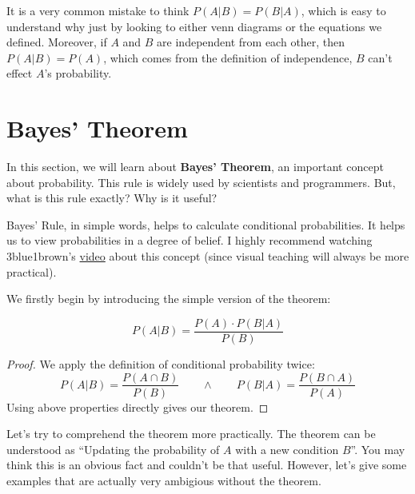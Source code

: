 It is a very common mistake to think $P( A | B) = P(B | A)$, which is easy to understand why just by looking to either venn diagrams or the equations we defined. Moreover, if $A$ and $B$ are independent from each other, then $P(A|B)= P(A)$, which comes from the definition of independence, $B$ can't effect $A$'s probability.

\section{Bayes' Theorem}

In this section, we will learn about \textbf{Bayes' Theorem}, an important concept about probability. This rule is widely used by scientists and programmers. But, what is this rule exactly? Why is it useful?

Bayes' Rule, in simple words, helps to calculate conditional probabilities. It helps us to view probabilities in a degree of belief. I highly recommend watching 3blue1brown's \href{https://www.youtube.com/watch?v=HZGCoVF3YvM&feature=emb_title}{video} about this concept (since visual teaching will always be more practical).

\par

We firstly begin by introducing the simple version of the theorem:
\begin{theorem}
    $$ P(A|B) = \frac{P(A) \cdot P(B|A)}{P(B)} $$
\end{theorem} 

\begin{proof}
    We apply the definition of conditional probability twice:
    $$ P(A|B) = \frac{P(A \cap B)}{P(B)} \qquad \land \qquad  P(B|A) = \frac{P(B \cap A)}{P(A)}$$
    Using above properties directly gives our theorem.
\end{proof}

\par 
Let's try to comprehend the theorem more practically. The theorem can be understood as ``Updating the probability of $A$ with a new condition $B$''. You may think this is an obvious fact and couldn't be that useful. However, let's give some examples that are actually very ambigious without the theorem.

